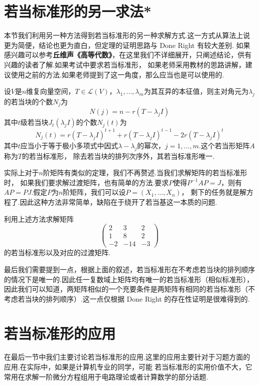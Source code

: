 \section{若当标准形的另一求法*}\label{sect:18:若当标准形的另一求法}
本节我们利用另一种方法得到若当标准形的另一种求解方式.这一方式从算法上说更为简便，结论也更为直白，但定理的证明思路与 Done Right 有较大差别.
如果感兴趣可以参考\textbf{丘维声《高等代数》}，在这里我们不详细展开，只阐述结论，供有兴趣的读者了解.如果考试中要求若当标准形，
如果老师采用教材的思路讲解，建议使用之前的方法.如果老师提到了这一角度，那么应当也是可以使用的.
\begin{theorem}
    设$V$是$n$维复向量空间，$T\in \mathcal{L}(V)$，$\lambda_1,\ldots,\lambda_m$为其互异的本征值，则主对角元为$\lambda_j$的若当块的个数$N_j$为
    \[N(j)=n-r(T-\lambda_jI)\]
    其中$t$级若当块$J_t(\lambda_jI)$的个数$N_j(t)$为
    \[N_j(t)=r(T-\lambda_jI)^{t+1}+r(T-\lambda_jI)^{t-1}-2r(T-\lambda_jI)^t\]
    其中$t$应当小于等于极小多项式中因式$\lambda-\lambda_j$的幂次，$j=1,\ldots,m$.这个若当形矩阵$A$称为$T$的若当标准形，
    除去若当块的排列次序外，其若当标准形唯一.
\end{theorem}
实际上对于$n$阶矩阵有类似的定理，我们不再赘述.当我们求解矩阵的若当标准形时，
如果我们要求解过渡矩阵，也有简单的方法.要求$P$使得$P^{-1}AP=J$，则有$AP=PJ$.假定$P$为$n$阶矩阵，我们可以设$P=(X_1,\ldots,X_n)$，
剩下的任务就是解方程了.因此这种方法非常简单，缺陷在于绕开了若当基这一本质的问题.
\begin{example}
    利用上述方法求解矩阵\[\begin{pmatrix}
        2 & 3 & 2 \\ 1 & 8 & 2 \\ -2 & -14 & -3
    \end{pmatrix}\]的若当标准形以及对应的过渡矩阵.
\end{example}
最后我们需要提到一点，根据上面的叙述，若当标准形在不考虑若当块的排列顺序的情况下是唯一的.因此任一复数域上矩阵均有唯一的若当标准形（相似标准形），
因此我们可以知道，两矩阵相似的一个充要条件是两矩阵有相同的若当标准形（不考虑若当块的排列顺序）.这一点仅根据 Done Right 的存在性证明是很难得到的.

\section{若当标准形的应用}
在最后一节中我们主要讨论若当标准形的应用.这里的应用主要针对于习题方面的应用.在实际中，如果是计算机专业的同学，可能
若当标准形的实用价值不大，它常用在求解一阶微分方程组用于电路理论或者计算数学的部分话题.

